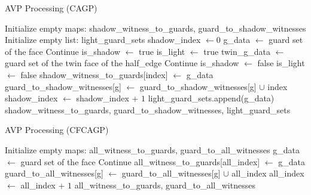 \begin{algorithm}
\caption{AVP Processing (CAGP)}\label{alg:AVP_processing}
\fontsize{10}{12}\selectfont
\begin{algorithmic}[1]
\State Initialize empty maps: shadow\_witness\_to\_guards, guard\_to\_shadow\_witnesses
\State Initialize empty list: light\_guard\_sets
\State shadow\_index $\gets 0$
    \State g\_data $\gets$ guard set of the face
        \State Continue
    \EndIf
    \State is\_shadow $\gets$ true
    \State is\_light $\gets$ true
        \State twin\_g\_data $\gets$ guard set of the twin face of the half\_edge
            \State Continue
        \EndIf
            \State is\_shadow $\gets$ false
        \EndIf
            \State is\_light $\gets$ false
        \EndIf
    \EndFor
        \State shadow\_witness\_to\_guards[index] $\gets$ g\_data
            \State guard\_to\_shadow\_witnesses[g] $\gets$ guard\_to\_shadow\_witnesses[g] $\cup$ index
        \EndFor
        \State shadow\_index $\gets$ shadow\_index + $1$
    \EndIf
        \State light\_guard\_sets.append(g\_data)
    \EndIf
\EndFor
\State \Return shadow\_witness\_to\_guards, guard\_to\_shadow\_witnesses, light\_guard\_sets
\EndProcedure
\end{algorithmic}
\end{algorithm}

\begin{algorithm}
\caption{AVP Processing (CFCAGP)}\label{alg:AVP_processing_cf}
\fontsize{10}{12}\selectfont
\begin{algorithmic}[1]
\State Initialize empty maps: all\_witness\_to\_guards, guard\_to\_all\_witnesses
    \State g\_data $\gets$ guard set of the face
        \State Continue
    \EndIf
    \State all\_witness\_to\_guards[all\_index] $\gets$ g\_data
        \State guard\_to\_all\_witnesses[g] $\gets$ guard\_to\_all\_witnesses[g] $\cup$ all\_index
    \EndFor
    \State all\_index $\gets$ all\_index + $1$
\EndFor
\State \Return all\_witness\_to\_guards, guard\_to\_all\_witnesses
\EndProcedure
\end{algorithmic}
\end{algorithm}

